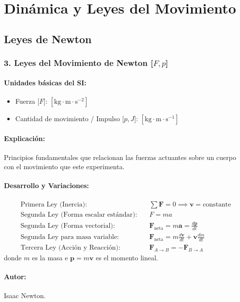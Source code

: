 \documentclass[12pt,a4paper]{article}
\begin{document}
\section{Dinámica y Leyes del Movimiento}

\subsection{Leyes de Newton}

\subsubsection*{3. Leyes del Movimiento de Newton [$F, p$]}
\paragraph*{Unidades básicas del SI:}
\begin{itemize}
    \item Fuerza [$F$]: $[\text{kg}\cdot\text{m}\cdot\text{s}^{-2}]$
    \item Cantidad de movimiento / Impulso [$p, J$]: $[\text{kg}\cdot\text{m}\cdot\text{s}^{-1}]$
\end{itemize}
\paragraph*{Explicación:} Principios fundamentales que relacionan las fuerzas actuantes sobre un cuerpo con el movimiento que este experimenta.
\paragraph*{Desarrollo y Variaciones:}
\begin{align*}
\text{Primera Ley (Inercia):} \quad & \sum \mathbf{F} = 0 \implies \mathbf{v} = \text{constante} \\
\text{Segunda Ley (Forma escalar estándar):} \quad & F = m a \\
\text{Segunda Ley (Forma vectorial):} \quad & \mathbf{F}_{\text{neta}} = m \mathbf{a} = \frac{d\mathbf{p}}{dt} \\
\text{Segunda Ley para masa variable:} \quad & \mathbf{F}_{\text{neta}} = m \frac{d\mathbf{v}}{dt} + \mathbf{v} \frac{dm}{dt} \\
\text{Tercera Ley (Acción y Reacción):} \quad & \mathbf{F}_{A \to B} = -\mathbf{F}_{B \to A}
\end{align*}
donde $m$ es la masa e $\mathbf{p} = m \mathbf{v}$ es el momento lineal.
\paragraph*{Autor:} Isaac Newton.
\end{document}
